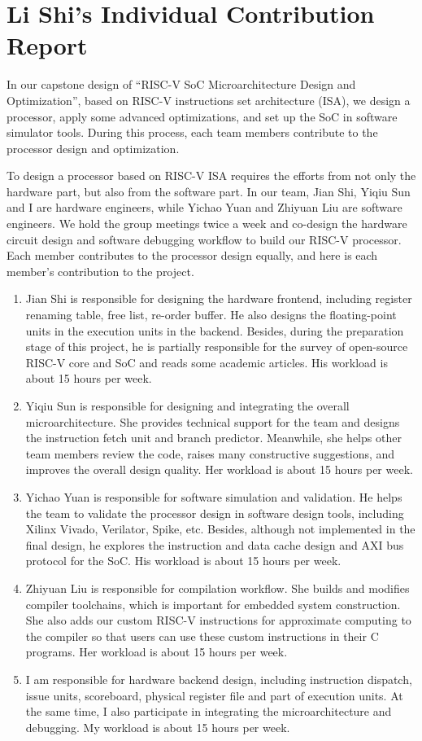 \chapter*{Li Shi's Individual Contribution Report}

In our capstone design of ``RISC-V SoC Microarchitecture Design and Optimization'', based on RISC-V instructions set architecture (ISA), we design a processor, apply some advanced optimizations, and set up the SoC in software simulator tools. During this process, each team members contribute to the processor design and optimization.

To design a processor based on RISC-V ISA requires the efforts from not only the hardware part, but also from the software part. In our team, Jian Shi, Yiqiu Sun and I are hardware engineers, while Yichao Yuan and Zhiyuan Liu are software engineers. We hold the group meetings twice a week and co-design the hardware circuit design and software debugging workflow to build our RISC-V processor. Each member contributes to the processor design equally, and here is each member’s contribution to the project.

\begin{enumerate}
  \item Jian Shi is responsible for designing the hardware frontend, including register renaming table, free list, re-order buffer. He also designs the floating-point units in the execution units in the backend. Besides, during the preparation stage of this project, he is partially responsible for the survey of open-source RISC-V core and SoC and reads some academic articles. His workload is about 15 hours per week.
  \item Yiqiu Sun is responsible for designing and integrating the overall microarchitecture. She provides technical support for the team and designs the instruction fetch unit and branch predictor. Meanwhile, she helps other team members review the code, raises many constructive suggestions, and improves the overall design quality. Her workload is about 15 hours per week.
  \item Yichao Yuan is responsible for software simulation and validation. He helps the team to validate the processor design in software design tools, including Xilinx Vivado, Verilator, Spike, etc. Besides, although not implemented in the final design, he explores the instruction and data cache design and AXI bus protocol for the SoC. His workload is about 15 hours per week.
  \item Zhiyuan Liu is responsible for compilation workflow. She builds and modifies compiler toolchains, which is important for embedded system construction. She also adds our custom RISC-V instructions for approximate computing to the compiler so that users can use these custom instructions in their C programs. Her workload is about 15 hours per week.
  \item I am responsible for hardware backend design, including instruction dispatch, issue units, scoreboard, physical register file and part of execution units. At the same time, I also participate in integrating the microarchitecture and debugging. My workload is about 15 hours per week.
\end{enumerate}

